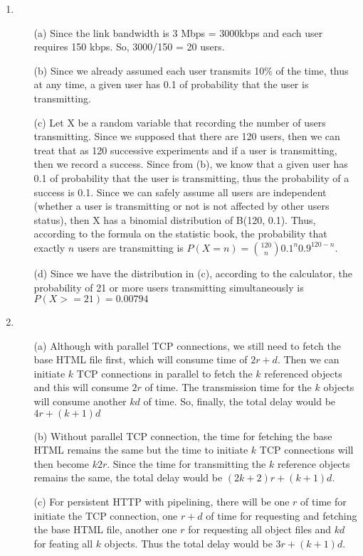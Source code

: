 \documentclass[12pt]{article}
\begin{document}
\begin{singlespace}
\begin{enumerate}
\item 
	\begin{itemize}
	\item[(a)] Since the link bandwidth is 3 Mbps = 3000kbps and each user requires 150 kbps. So, 3000/150 = 20 users.
	\item[(b)] Since we already assumed each user transmits 10\% of the time, thus at any time, a given user has 0.1 of probability that the user is transmitting.
	\item[(c)] Let X be a random variable that recording the number of users transmitting. Since we supposed that there are 120 users, then we can treat that as 120 successive experiments and if a user is transmitting, then we record a success. Since from (b), we know that a given user has 0.1 of probability that the user is transmitting, thus the probability of a success is 0.1. Since we can safely assume all users are independent (whether a user is transmitting or not is not affected by other users status), then X has a binomial distribution of B(120, 0.1). Thus, according to the formula on the statistic book, the probability that exactly $n$ users are transmitting is $P(X=n) = \binom {120}{n} 0.1^n 0.9^{120-n}$.
	\item[(d)] Since we have the distribution in (c), according to the calculator, the probability of 21 or more users transmitting simultaneously is $P(X>=21) = 0.00794$
	\end{itemize}
\item
	\begin{itemize}
	\item[(a)] Although with parallel TCP connections, we still need to fetch the base HTML file first, which will consume time of $2r + d$. Then we can initiate $k$ TCP connections in parallel to fetch the $k$ referenced objects and this will consume $2r$ of time. The transmission time for the $k$ objects will consume another $k d$ of time. So, finally, the total delay would be $4r + (k+1)d$
	\item[(b)] Without parallel TCP connection, the time for fetching the base HTML remains the same but the time to initiate $k$ TCP connections will then become $k 2r$. Since the time for transmitting the $k$ reference objects remains the same, the total delay would be $(2k+2)r + (k+1)d$. 
	\item[(c)] For persistent HTTP with pipelining, there will be one $r$ of time for initiate the TCP connection, one $r + d$ of time for requesting and fetching the base HTML file, another one $r$ for requesting all object files and $k d$ for feating all $k$ objects. Thus the total delay would be $3r + (k+1)d$.

\end{itemize}
\end{enumerate}
\end{singlespace}
\end{document}
